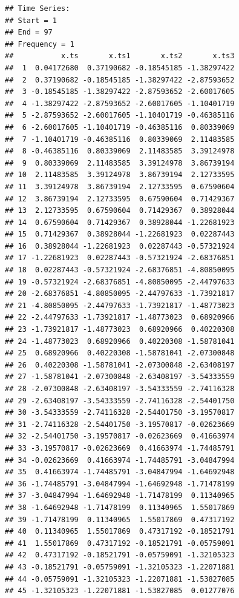 \documentclass[
]{book}
\theoremstyle{definition}
\theoremstyle{definition}
\theoremstyle{definition}
\theoremstyle{definition}
\theoremstyle{remark}
\begin{document}
\begin{verbatim}
## Time Series:
## Start = 1 
## End = 97 
## Frequency = 1 
##           x.ts       x.ts1       x.ts2       x.ts3
##  1  0.04172680  0.37190682 -0.18545185 -1.38297422
##  2  0.37190682 -0.18545185 -1.38297422 -2.87593652
##  3 -0.18545185 -1.38297422 -2.87593652 -2.60017605
##  4 -1.38297422 -2.87593652 -2.60017605 -1.10401719
##  5 -2.87593652 -2.60017605 -1.10401719 -0.46385116
##  6 -2.60017605 -1.10401719 -0.46385116  0.80339069
##  7 -1.10401719 -0.46385116  0.80339069  2.11483585
##  8 -0.46385116  0.80339069  2.11483585  3.39124978
##  9  0.80339069  2.11483585  3.39124978  3.86739194
## 10  2.11483585  3.39124978  3.86739194  2.12733595
## 11  3.39124978  3.86739194  2.12733595  0.67590604
## 12  3.86739194  2.12733595  0.67590604  0.71429367
## 13  2.12733595  0.67590604  0.71429367  0.38928044
## 14  0.67590604  0.71429367  0.38928044 -1.22681923
## 15  0.71429367  0.38928044 -1.22681923  0.02287443
## 16  0.38928044 -1.22681923  0.02287443 -0.57321924
## 17 -1.22681923  0.02287443 -0.57321924 -2.68376851
## 18  0.02287443 -0.57321924 -2.68376851 -4.80850095
## 19 -0.57321924 -2.68376851 -4.80850095 -2.44797633
## 20 -2.68376851 -4.80850095 -2.44797633 -1.73921817
## 21 -4.80850095 -2.44797633 -1.73921817 -1.48773023
## 22 -2.44797633 -1.73921817 -1.48773023  0.68920966
## 23 -1.73921817 -1.48773023  0.68920966  0.40220308
## 24 -1.48773023  0.68920966  0.40220308 -1.58781041
## 25  0.68920966  0.40220308 -1.58781041 -2.07300848
## 26  0.40220308 -1.58781041 -2.07300848 -2.63408197
## 27 -1.58781041 -2.07300848 -2.63408197 -3.54333559
## 28 -2.07300848 -2.63408197 -3.54333559 -2.74116328
## 29 -2.63408197 -3.54333559 -2.74116328 -2.54401750
## 30 -3.54333559 -2.74116328 -2.54401750 -3.19570817
## 31 -2.74116328 -2.54401750 -3.19570817 -0.02623669
## 32 -2.54401750 -3.19570817 -0.02623669  0.41663974
## 33 -3.19570817 -0.02623669  0.41663974 -1.74485791
## 34 -0.02623669  0.41663974 -1.74485791 -3.04847994
## 35  0.41663974 -1.74485791 -3.04847994 -1.64692948
## 36 -1.74485791 -3.04847994 -1.64692948 -1.71478199
## 37 -3.04847994 -1.64692948 -1.71478199  0.11340965
## 38 -1.64692948 -1.71478199  0.11340965  1.55017869
## 39 -1.71478199  0.11340965  1.55017869  0.47317192
## 40  0.11340965  1.55017869  0.47317192 -0.18521791
## 41  1.55017869  0.47317192 -0.18521791 -0.05759091
## 42  0.47317192 -0.18521791 -0.05759091 -1.32105323
## 43 -0.18521791 -0.05759091 -1.32105323 -1.22071881
## 44 -0.05759091 -1.32105323 -1.22071881 -1.53827085
## 45 -1.32105323 -1.22071881 -1.53827085  0.01277076

\end{verbatim}
\end{document}
